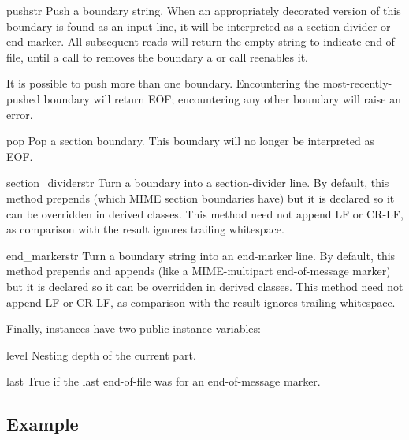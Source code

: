 \begin{methoddesc}{push}{str}
Push a boundary string.  When an appropriately decorated version of
this boundary is found as an input line, it will be interpreted as a
section-divider or end-marker.  All subsequent
reads will return the empty string to indicate end-of-file, until a
call to  removes the boundary a or  call
reenables it.

It is possible to push more than one boundary.  Encountering the
most-recently-pushed boundary will return EOF; encountering any other
boundary will raise an error.
\end{methoddesc}

\begin{methoddesc}{pop}{}
Pop a section boundary.  This boundary will no longer be interpreted
as EOF.
\end{methoddesc}

\begin{methoddesc}{section_divider}{str}
Turn a boundary into a section-divider line.  By default, this
method prepends  (which MIME section boundaries have) but
it is declared so it can be overridden in derived classes.  This
method need not append LF or CR-LF, as comparison with the result
ignores trailing whitespace. 
\end{methoddesc}

\begin{methoddesc}{end_marker}{str}
Turn a boundary string into an end-marker line.  By default, this
method prepends  and appends  (like a
MIME-multipart end-of-message marker) but it is declared so it can be
overridden in derived classes.  This method need not append LF or
CR-LF, as comparison with the result ignores trailing whitespace.
\end{methoddesc}

Finally,  instances have two public instance variables:

\begin{memberdesc}{level}
Nesting depth of the current part.
\end{memberdesc}

\begin{memberdesc}{last}
True if the last end-of-file was for an end-of-message marker. 
\end{memberdesc}


\subsection{ Example \label{multifile-example}}


